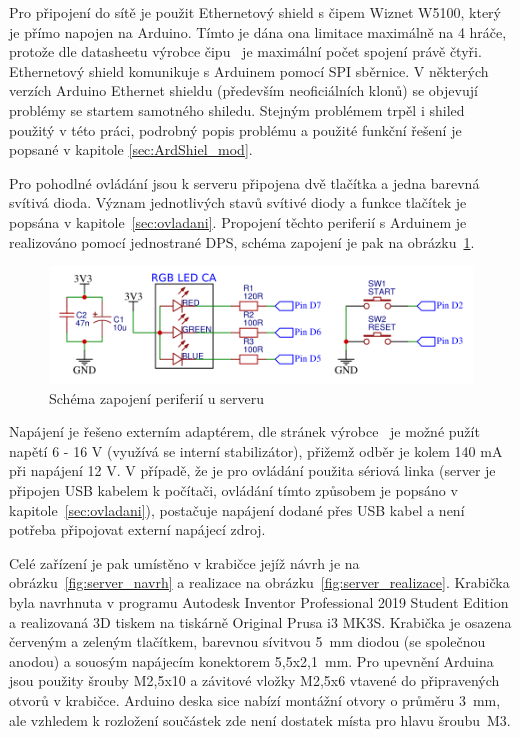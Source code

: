 Pro připojení do sítě je použit Ethernetový shield s čipem Wiznet W5100, který je přímo napojen na Arduino. Tímto je dána ona limitace maximálně na 4 hráče, protože dle datasheetu výrobce čipu~\cite{datasheet_w5100} je maximální počet spojení právě čtyři. Ethernetový shield komunikuje s Arduinem pomocí SPI sběrnice. V některých verzích Arduino Ethernet shieldu (především neoficiálních klonů) se objevují problémy se startem samotného shiledu. Stejným problémem trpěl i shiled použitý v této práci, podrobný popis problému a použité funkční řešení je popsané v kapitole \ref{sec:ArdShiel_mod}.

Pro pohodlné ovládání jsou k serveru připojena dvě tlačítka a jedna barevná svítivá dioda. Význam jednotlivých stavů svítivé diody a funkce tlačítek je popsána v kapitole~\ref{sec:ovladani}. Propojení těchto periferií s Arduinem je realizováno pomocí jednostrané DPS, schéma zapojení je pak na obrázku~\ref{fig:server_module}.

\begin{figure}[hbtp]
  \centering
  \includegraphics[width=12cm]{img/server_module.png}
  \caption{\label{fig:server_module} Schéma zapojení periferií u serveru}
\end{figure}

Napájení je řešeno externím adaptérem, dle stránek výrobce~\cite{ArdDue_web} je možné pužít napětí 6 - 16 V (využívá se interní stabilizátor), přižemž odběr je kolem 140 mA při napájení 12 V. V případě, že je pro ovládání použita sériová linka (server je připojen USB kabelem k počítači, ovládání tímto způsobem je popsáno v kapitole~\ref{sec:ovladani}), postačuje napájení dodané přes USB kabel a není potřeba připojovat externí napájecí zdroj.

Celé zařízení je pak umístěno v krabičce jejíž návrh je na obrázku~\ref{fig:server_navrh} a realizace na obrázku~\ref{fig:server_realizace}. Krabička byla navrhnuta v programu Autodesk Inventor Professional 2019 Student Edition a realizovaná 3D tiskem na tiskárně Original Prusa i3 MK3S. Krabička je osazena červeným a zeleným tlačítkem, barevnou sívitvou 5~mm diodou (se společnou anodou) a souosým napájecím konektorem 5,5x2,1~mm. Pro upevnění Arduina jsou použity šrouby M2,5x10 a závitové vložky M2,5x6 vtavené do připravených otvorů v krabičce. Arduino deska sice nabízí montážní otvory o průměru 3~mm, ale vzhledem k rozložení součástek zde není dostatek místa pro hlavu šroubu~M3.

